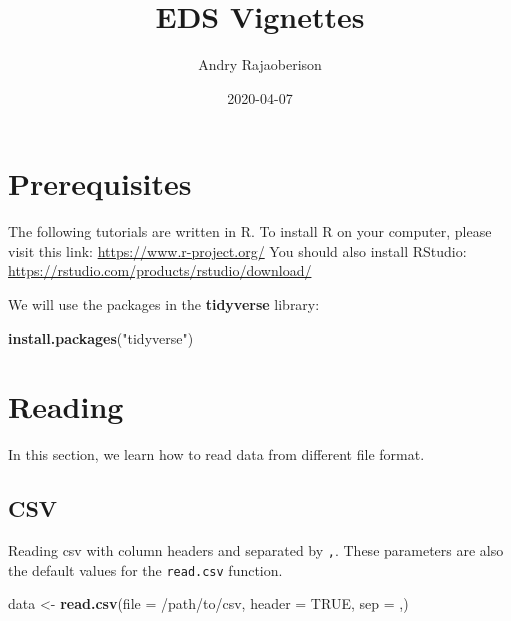 \documentclass[
]{book}
\title{EDS Vignettes}
\author{Andry Rajaoberison}
\date{2020-04-07}
\newenvironment{Shaded}{\begin{snugshade}}{\end{snugshade}}
\newcommand{\DataTypeTok}[1]{\textcolor[rgb]{0.13,0.29,0.53}{#1}}
\newcommand{\KeywordTok}[1]{\textcolor[rgb]{0.13,0.29,0.53}{\textbf{#1}}}
\newcommand{\NormalTok}[1]{#1}
\newcommand{\OtherTok}[1]{\textcolor[rgb]{0.56,0.35,0.01}{#1}}
\newcommand{\StringTok}[1]{\textcolor[rgb]{0.31,0.60,0.02}{#1}}
\begin{document}
\maketitle

{
\setcounter{tocdepth}{1}
\tableofcontents
}
\hypertarget{prerequisites}{%
\chapter*{Prerequisites}\label{prerequisites}}

The following tutorials are written in R. To install R on your computer, please visit this link: \url{https://www.r-project.org/}
You should also install RStudio: \url{https://rstudio.com/products/rstudio/download/}

We will use the packages in the \textbf{tidyverse} library:

\begin{Shaded}
\begin{Highlighting}[]
\KeywordTok{install.packages}\NormalTok{(}\StringTok{"tidyverse"}\NormalTok{)}
\end{Highlighting}
\end{Shaded}

\hypertarget{reading}{%
\chapter{Reading}\label{reading}}

In this section, we learn how to read data from different file format.

\hypertarget{csv}{%
\section{CSV}\label{csv}}

Reading csv with column headers and separated by \texttt{,}. These parameters are also the default values for the \texttt{read.csv} function.

\begin{Shaded}
\begin{Highlighting}[]
\NormalTok{data \textless{}{-}}\StringTok{ }\KeywordTok{read.csv}\NormalTok{(}\DataTypeTok{file =} \StringTok{\textquotesingle{}/path/to/csv\textquotesingle{}}\NormalTok{, }\DataTypeTok{header =} \OtherTok{TRUE}\NormalTok{, }\DataTypeTok{sep =} \StringTok{\textquotesingle{},\textquotesingle{}}\NormalTok{)}
\end{Highlighting}
\end{Shaded}
\end{document}
